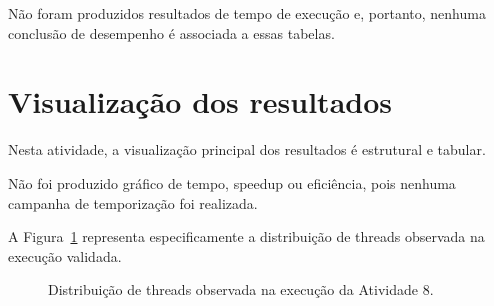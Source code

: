 Não foram produzidos resultados de tempo de execução e, portanto, nenhuma
conclusão de desempenho é associada a essas tabelas.


\section{Visualização dos resultados}
\label{sec:atvd08-visualizacao}

Nesta atividade, a visualização principal dos resultados é estrutural e
tabular.

Não foi produzido gráfico de tempo, speedup ou eficiência, pois nenhuma
campanha de temporização foi realizada.

A Figura~\ref{fig:atvd08-paralelismo-observado} representa especificamente a
distribuição de threads observada na execução validada.

\begin{figure}[htbp]
    \centering


    \caption{Distribuição de threads observada na execução da Atividade 8.}
    \label{fig:atvd08-paralelismo-observado}
\end{figure}

